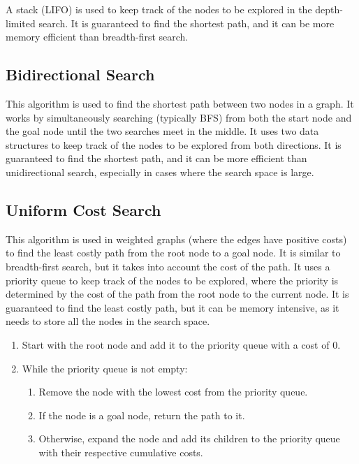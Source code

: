 A stack (LIFO) is used to keep track of the nodes to be explored in the depth-limited search. It is guaranteed to find the shortest path, and it can be more memory efficient than breadth-first search.

\subsection{Bidirectional Search}

This algorithm is used to find the shortest path between two nodes in a graph. It works by simultaneously searching (typically BFS) from both the start node and the goal node until the two searches meet in the middle. It uses two data structures to keep track of the nodes to be explored from both directions. It is guaranteed to find the shortest path, and it can be more efficient than unidirectional search, especially in cases where the search space is large.

\subsection{Uniform Cost Search}

This algorithm is used in weighted graphs (where the edges have positive costs) to find the least costly path from the root node to a goal node. It is similar to breadth-first search, but it takes into account the cost of the path.
It uses a priority queue to keep track of the nodes to be explored, where the priority is determined by the cost of the path from the root node to the current node. It is guaranteed to find the least costly path, but it can be memory intensive, as it needs to store all the nodes in the search space.
\begin{enumerate}
    \item Start with the root node and add it to the priority queue with a cost of 0.
    \item While the priority queue is not empty:
    \begin{enumerate}
        \item Remove the node with the lowest cost from the priority queue.
        \item If the node is a goal node, return the path to it.
        \item Otherwise, expand the node and add its children to the priority queue with their respective cumulative costs.
    \end{enumerate}
\end{enumerate}



